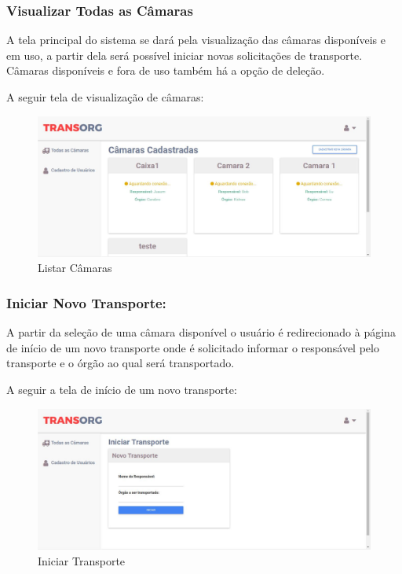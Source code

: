 \subsubsection{Visualizar Todas as Câmaras}
	A tela principal do sistema se dará pela visualização das câmaras disponíveis e em uso, a partir dela será possível iniciar novas solicitações de transporte. Câmaras disponíveis e fora de uso também há a opção de deleção.
	
	A seguir tela de visualização de câmaras:

\begin{figure}[H]
\centering
\includegraphics[width=16cm]{figuras/listaCamaras_software.JPG}
\caption{Listar Câmaras}
\end{figure}

\subsubsection{Iniciar Novo Transporte:}
	A partir da seleção de uma câmara disponível o usuário é redirecionado à página de início de um novo transporte onde é solicitado informar o responsável pelo transporte e o órgão ao qual será transportado.
	
	A seguir a tela de início de um novo transporte:

\begin{figure}[H]
\centering
\includegraphics[width=16cm]{figuras/iniciarTransporte_software.JPG}
\caption{Iniciar Transporte}
\end{figure}

